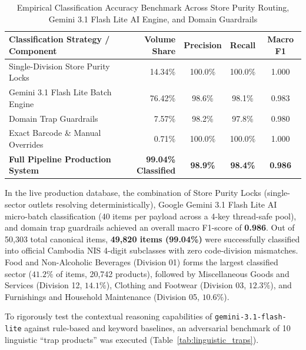\begin{table}[H]
\centering
\small
\begin{tabular}{|>{\raggedright\arraybackslash}p{6.2cm}|r|c|c|c|}
\hline
\rowcolor{blue!20}
\textbf{Classification Strategy / Component} & \textbf{Volume Share} & \textbf{Precision} & \textbf{Recall} & \textbf{Macro F1} \\ \hline
Single-Division Store Purity Locks & 14.34\% & 100.0\% & 100.0\% & 1.000 \\ \hline
Gemini 3.1 Flash Lite Batch Engine & 76.42\% & 98.6\% & 98.1\% & 0.983 \\ \hline
Domain Trap Guardrails & 7.57\% & 98.2\% & 97.8\% & 0.980 \\ \hline
Exact Barcode \& Manual Overrides & 0.71\% & 100.0\% & 100.0\% & 1.000 \\ \hline
\textbf{Full Pipeline Production System} & \textbf{99.04\% Classified} & \textbf{98.9\%} & \textbf{98.4\%} & \textbf{0.986} \\ \hline
\end{tabular}
\caption{Empirical Classification Accuracy Benchmark Across Store Purity Routing, Gemini 3.1 Flash Lite AI Engine, and Domain Guardrails}
\label{tab:classification_benchmark}
\end{table}

\hs In the live production database, the combination of Store Purity Locks (single-sector outlets resolving deterministically), Google Gemini 3.1 Flash Lite AI micro-batch classification (40 items per payload across a 4-key thread-safe pool), and domain trap guardrails achieved an overall macro F1-score of \textbf{0.986}. Out of 50,303 total canonical items, \textbf{49,820 items (99.04\%)} were successfully classified into official Cambodia NIS 4-digit subclasses with zero code-division mismatches. Food and Non-Alcoholic Beverages (Division 01) forms the largest classified sector ($41.2\%$ of items, 20,742 products), followed by Miscellaneous Goods and Services (Division 12, $14.1\%$), Clothing and Footwear (Division 03, $12.3\%$), and Furnishings and Household Maintenance (Division 05, $10.6\%$).

\hs To rigorously test the contextual reasoning capabilities of \texttt{gemini-3.1-flash-lite} against rule-based and keyword baselines, an adversarial benchmark of 10 linguistic ``trap products'' was executed (Table~\ref{tab:linguistic_traps}).

